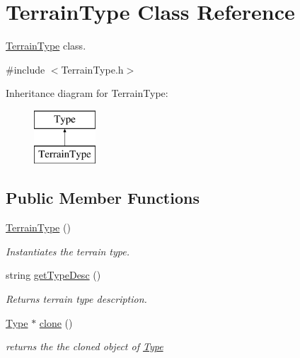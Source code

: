 \hypertarget{classTerrainType}{}\section{Terrain\+Type Class Reference}
\label{classTerrainType}


\hyperlink{classTerrainType}{Terrain\+Type} class.  




{\ttfamily \#include $<$Terrain\+Type.\+h$>$}

Inheritance diagram for Terrain\+Type\+:\begin{figure}[H]
\begin{center}
\leavevmode
\includegraphics[height=2.000000cm]{classTerrainType}
\end{center}
\end{figure}
\subsection*{Public Member Functions}
\begin{DoxyCompactItemize}
\item 
\mbox{\label{classTerrainType_aea114fb5e125b58bf9d9c9ab964749c7}} 
\hyperlink{classTerrainType_aea114fb5e125b58bf9d9c9ab964749c7}{Terrain\+Type} ()
\begin{DoxyCompactList}\small\item\em Instantiates the terrain type. \end{DoxyCompactList}\item 
string \hyperlink{classTerrainType_af24f4291676b6862c90b0d29598fcb11}{get\+Type\+Desc} ()
\begin{DoxyCompactList}\small\item\em Returns terrain type description. \end{DoxyCompactList}\item 
\hyperlink{classType}{Type} $\ast$ \hyperlink{classTerrainType_aa2c54fdc07981dab3941f28221e22655}{clone} ()
\begin{DoxyCompactList}\small\item\em returns the the cloned object of \hyperlink{classType}{Type} \end{DoxyCompactList}\end{DoxyCompactItemize}



